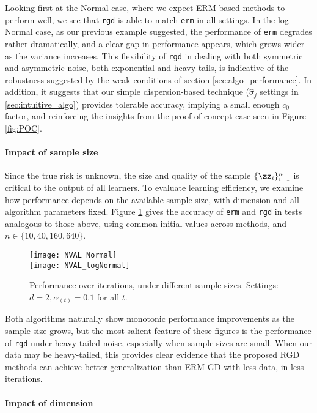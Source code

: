 \documentclass[11pt,oneside]{article}
\theoremstyle{definition} \newtheorem{defn}{Definition}       %
\theoremstyle{plain} \newtheorem{prop}[defn]{Proposition}           %
\theoremstyle{plain} \newtheorem{thm}[defn]{Theorem}                %
\theoremstyle{plain} \newtheorem{lem}[defn]{Lemma}                  %
\theoremstyle{plain} \newtheorem{cor}[defn]{Corollary}              %
\theoremstyle{remark} \newtheorem{rmk}[defn]{Remark}                %
\theoremstyle{remark} \newtheorem{ex}[defn]{Example}                %
\begin{document}
Looking first at the Normal case, where we expect ERM-based methods to perform well, we see that \texttt{rgd} is able to match \texttt{erm} in all settings. In the log-Normal case, as our previous example suggested, the performance of \texttt{erm} degrades rather dramatically, and a clear gap in performance appears, which grows wider as the variance increases. This flexibility of \texttt{rgd} in dealing with both symmetric and asymmetric noise, both exponential and heavy tails, is indicative of the robustness suggested by the weak conditions of section \ref{sec:algo_performance}. In addition, it suggests that our simple dispersion-based technique ($\widehat{\sigma}_{j}$ settings in \ref{sec:intuitive_algo}) provides tolerable accuracy, implying a small enough $c_{0}$ factor, and reinforcing the insights from the proof of concept case seen in Figure \ref{fig:POC}.


\paragraph{Impact of sample size}

Since the true risk is unknown, the size and quality of the sample $\{\zz_{i}\}_{i=1}^{n}$ is critical to the output of all learners. To evaluate learning efficiency, we examine how performance depends on the available sample size, with dimension and all algorithm parameters fixed. Figure \ref{fig:NVAL} gives the accuracy of \texttt{erm} and \texttt{rgd} in tests analogous to those above, using common initial values across methods, and $n \in \{10, 40, 160, 640\}$.

\begin{figure}[t]
\centering
\texttt{[image: NVAL\_Normal]}\\
\texttt{[image: NVAL\_logNormal]}
\caption{Performance over iterations, under different sample sizes. Settings: $d=2, \alpha_{(t)}=0.1$ for all $t$.}
\label{fig:NVAL}
\end{figure}

Both algorithms naturally show monotonic performance improvements as the sample size grows, but the most salient feature of these figures is the performance of \texttt{rgd} under heavy-tailed noise, especially when sample sizes are small. When our data may be heavy-tailed, this provides clear evidence that the proposed RGD methods can achieve better generalization than ERM-GD with less data, in less iterations.


\paragraph{Impact of dimension}
\end{document}
